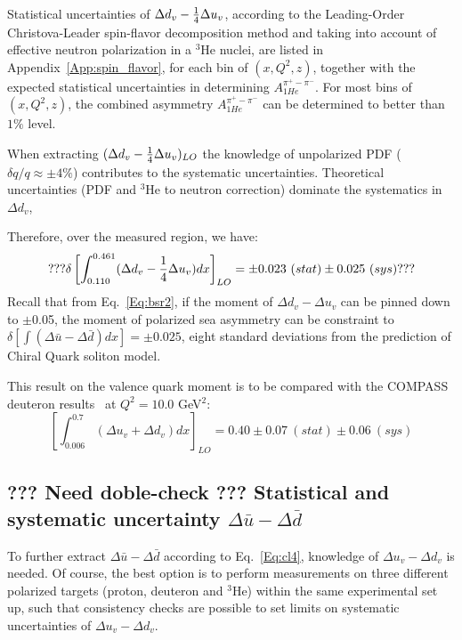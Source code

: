 Statistical uncertainties of $\Delta d_v-{1 \over 4} \Delta u_v$, according to the Leading-Order Christova-Leader spin-flavor decomposition method and taking into account of effective neutron polarization in a $^3$He nuclei, are listed in Appendix~\ref{App:spin_flavor}, for each bin of $(x, Q^2, z)$, together with the expected statistical uncertainties in determining  $A_{1He}^{\pi^+ - \pi^-}$. For most bins of $(x, Q^2, z)$, the combined asymmetry $A_{1He}^{\pi^+ - \pi^-}$ can be determined to better than $1\%$ level.


When extracting $( \Delta d_v -{1 \over 4} \Delta u_v )_{LO}$ 
the knowledge of unpolarized PDF ($\delta q/q \approx \pm 4\%$)  contributes 
to the systematic uncertainties. Theoretical uncertainties 
(PDF and $^3$He to neutron correction) dominate the systematics in $\Delta d_v$, %

Therefore, over the measured region, we have:
\begin{equation}
 ??? \delta \left[\int_{0.110}^{0.461}(\Delta d_v -{1 \over 4} \Delta u_v)dx \right]_{LO} = \pm 0.023 ~(stat) \pm 0.025~(sys) ???
\end{equation}
Recall that from Eq.~\ref{Eq:bsr2}, if the moment of $\Delta d_v- \Delta u_v$ can be pinned down to $\pm$0.05, 
the moment of polarized sea asymmetry can be constraint to $\delta \left[\int(\Delta \bar{u} - \Delta \bar{d})dx \right] = \pm 0.025$, eight
standard deviations from the prediction of Chiral Quark soliton model.
 
 This result on the valence quark moment is to be compared with the COMPASS deuteron results~\cite{compass2007} at $Q^2=10.0$ GeV$^2$:
\begin{equation}
  \left[\int_{0.006}^{0.7}(\Delta u_v + \Delta d_v)dx \right]_{LO} =  0.40 \pm 0.07 ~(stat) \pm 0.06~(sys) 
\end{equation}


\subsection{??? Need doble-check ??? Statistical and systematic uncertainty $\Delta \bar{u} -\Delta \bar{d}$}
To further extract $\Delta \bar{u}-\Delta \bar{d}$ according to Eq.~\ref{Eq:cl4}, 
knowledge of $\Delta u_v - \Delta d_v$ is needed.  
Of course, the best option is to perform measurements on three different polarized 
targets (proton, deuteron and $^3$He) within the same experimental set up, such that
consistency checks are possible to set limits on systematic uncertainties of $\Delta u_v - \Delta d_v$.

